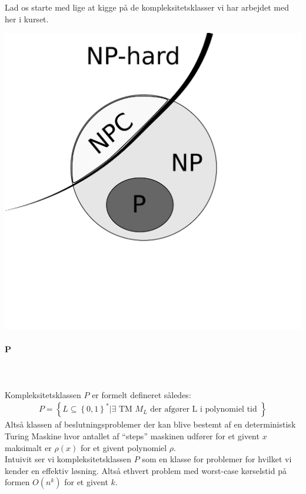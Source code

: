 Lad os starte med lige at kigge på de kompleksitetsklasser vi har arbejdet med her i kurset.
\begin{center}
 \includegraphics[bb=0 0 400 400,scale=0.3]{./PNPNPC.png}
\end{center}


\paragraph{P}
~\\
~\\
Kompleksitetsklassen $P$ er formelt defineret således:
\begin{align*}
 P = \left\lbrace L \subseteq \left\lbrace 0,1 \right\rbrace^* | \exists \text{ TM } M_L \text{ der afgører L i polynomiel tid } \right\rbrace
\end{align*}
Altså klassen af beslutningsproblemer der kan blive bestemt af en deterministisk Turing Maskine hvor antallet af ``steps'' maskinen udfører for et givent $x$ maksimalt er $\rho(x)$ for et givent polynomiel $\rho$.\\
 
Intuivit ser vi kompleksitetsklassen $P$ som en klasse for problemer for hvilket vi kender en effektiv løsning. Altså ethvert problem med worst-case kørselstid på formen $O(n^k)$ for et givent $k$.

